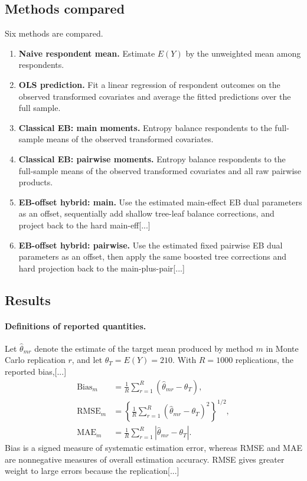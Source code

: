 \documentclass[11pt]{article}
\begin{document}
{\subsection{Methods compared}

Six methods are compared.
\begin{enumerate}[leftmargin=2em]
\item \textbf{Naive respondent mean.} Estimate $E(Y)$ by the unweighted mean among respondents.
\item \textbf{OLS prediction.} Fit a linear regression of respondent outcomes on the observed transformed covariates and average the fitted predictions over the full sample.
\item \textbf{Classical EB: main moments.} Entropy balance respondents to the full-sample means of the observed transformed covariates.
\item \textbf{Classical EB: pairwise moments.} Entropy balance respondents to the full-sample means of the observed transformed covariates and all raw pairwise products.
\item \textbf{EB-offset hybrid: main.} Use the estimated main-effect EB dual parameters as an offset, sequentially add shallow tree-leaf balance corrections, and project back to the hard main-eff[...]
\item \textbf{EB-offset hybrid: pairwise.} Use the estimated fixed pairwise EB dual parameters as an offset, then apply the same boosted tree corrections and hard projection back to the main-plus-pair[...]
\end{enumerate}

\subsection{Results}

\paragraph{Definitions of reported quantities.}

Let $\widehat\theta_{mr}$ denote the estimate of the target mean produced by method $m$ in Monte Carlo replication $r$, and let $\theta_T=E(Y)=210$. With $R=1000$ replications, the reported bias,[...]
\begin{align*}
\mathrm{Bias}_m
&=
\frac{1}{R}\sum_{r=1}^R
(\widehat\theta_{mr}-\theta_T),\\
\mathrm{RMSE}_m
&=
\left\{
\frac{1}{R}\sum_{r=1}^R
(\widehat\theta_{mr}-\theta_T)^2
\right\}^{1/2},\\
\mathrm{MAE}_m
&=
\frac{1}{R}\sum_{r=1}^R
\left|\widehat\theta_{mr}-\theta_T\right|.
\end{align*}
Bias is a signed measure of systematic estimation error, whereas RMSE and MAE are nonnegative measures of overall estimation accuracy. RMSE gives greater weight to large errors because the replication[...] 

}
\end{document}
